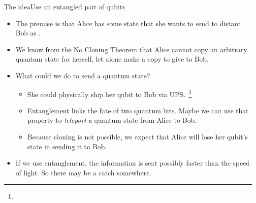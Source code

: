 \begin{frame}{The idea}{Use an entangled pair of qubits}

\begin{itemize}[<+->]
    \item The premise is that Alice has some state  that she wants to send to distant Bob as .
    \item We know from the No Cloning Theorem that Alice cannot copy an arbitrary quantum state for herself, let alone make a copy to give to Bob.
    \item What could we do to send a quantum state?
    \begin{itemize}
    \item She could physically ship her qubit to Bob via UPS.~\footnote{}
    \item Entanglement links the fate of two quantum bits.  Maybe we can use that property to \emph{teleport} a quantum state from Alice to Bob.
    \item Because cloning is not possible, we expect that Alice will lose her qubit's state in sending it to Bob.
    \end{itemize}
    \item If we use entanglement, the information is sent possibly faster than the speed of light.  So there may be a catch somewhere.
\end{itemize}

\end{frame}

